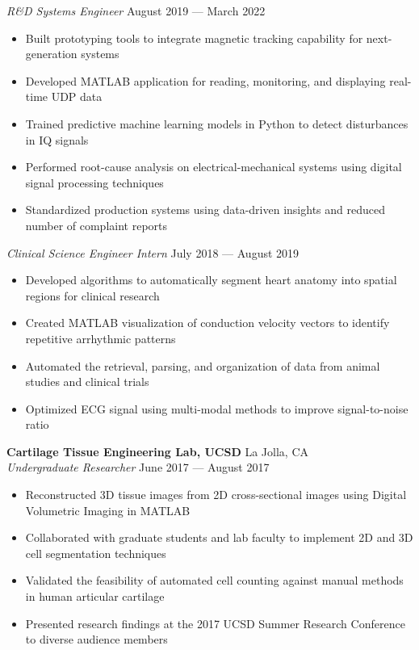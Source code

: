 \documentclass{article}
\begin{document}
\textit{R\&D Systems Engineer} \hfill August 2019 --- March 2022\\
\vspace{-2mm}
\begin{itemize} \itemsep 0.05pt
	\item Built prototyping tools to integrate magnetic tracking capability for next-generation systems
	\item Developed MATLAB application for reading, monitoring, and displaying real-time UDP data
	\item Trained predictive machine learning models in Python to detect disturbances in IQ signals
	\item Performed root-cause analysis on electrical-mechanical systems using digital signal processing techniques
	\item Standardized production systems using data-driven insights and reduced number of complaint reports
\end{itemize}

\textit{Clinical Science Engineer Intern} \hfill July 2018 --- August 2019\\
\vspace{-2mm}
\begin{itemize} \itemsep 0.05pt
	\item Developed algorithms to automatically segment heart anatomy into spatial regions for clinical research
	\item Created MATLAB visualization of conduction velocity vectors to identify repetitive arrhythmic patterns
	\item Automated the retrieval, parsing, and organization of data from animal studies and clinical trials
	\item Optimized ECG signal using multi-modal methods to improve signal-to-noise ratio
\end{itemize}


\textbf{Cartilage Tissue Engineering Lab, UCSD} \hfill La Jolla, CA\\
\textit{Undergraduate Researcher} \hfill June 2017 --- August 2017\\
\vspace{-2mm}
\begin{itemize} \itemsep 0.05pt
	\item Reconstructed 3D tissue images from 2D cross-sectional images using Digital Volumetric Imaging in MATLAB
	\item Collaborated with graduate students and lab faculty to implement 2D and 3D cell segmentation techniques
	\item Validated the feasibility of automated cell counting against manual methods in human articular cartilage
	\item Presented research findings at the 2017 UCSD Summer Research Conference to diverse audience members
\end{itemize}
\end{document}

